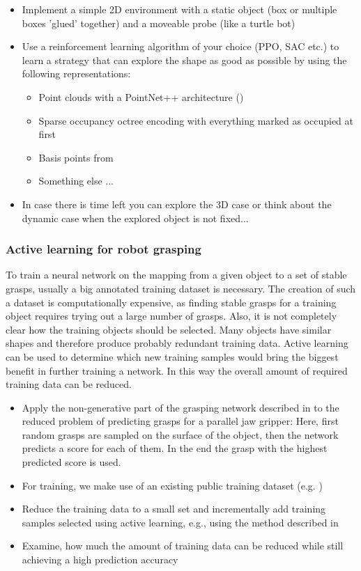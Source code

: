 \documentclass[a4paper]{article}
\begin{document}
\begin{itemize}
  \item Implement a simple 2D environment with a static object (box or multiple boxes 'glued' together) and a moveable probe (like a turtle bot)
  \item Use a reinforcement learning algorithm of your choice (PPO, SAC etc.) to learn a strategy that can explore the shape as good as possible by using the following representations:
  \begin{itemize}
    \item Point clouds with a PointNet++ architecture (\citet{DBLPQiYSG17})
    \item Sparse occupancy octree encoding with everything marked as occupied at first
    \item Basis points from ~\citet{Prokudin2019}
    \item Something else ...
  \end{itemize}
  \item In case there is time left you can explore the 3D case or think about the dynamic case when the explored object is not fixed...
\end{itemize}

\subsubsection{Active learning for robot grasping}

To train a neural network on the mapping from a given object to a set of stable grasps, usually a big annotated training dataset is necessary.
The creation of such a dataset is computationally expensive, as finding stable grasps for a training object requires trying out a large number of grasps.
Also, it is not completely clear how the training objects should be selected.
Many objects have similar shapes and therefore produce probably redundant training data.
Active learning can be used to determine which new training samples would bring the biggest benefit in further training a network.
In this way the overall amount of required training data can be reduced.

\begin{itemize}
  \item Apply the non-generative part of the grasping network described in \citet{winkelbauer2022} to the reduced problem of predicting grasps for a parallel jaw gripper:
        Here, first random grasps are sampled on the surface of the object, then the network predicts a score for each of them.
        In the end the grasp with the highest predicted score is used.
  \item For training, we make use of an existing public training dataset (e.g. \citet{acronym2020})
  \item Reduce the training data to a small set and incrementally add training samples selected using active learning, e.g., using the method described in \citet{gal2017deep}
  \item Examine, how much the amount of training data can be reduced while still achieving a high prediction accuracy
\end{itemize}
\end{document}
